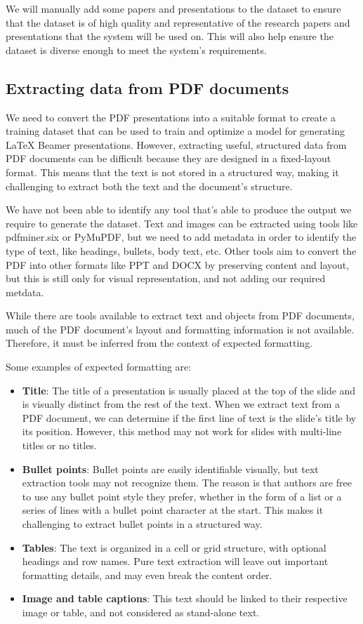 We will manually add some papers and presentations to the dataset to ensure that the dataset is of high quality and representative of the research papers and presentations that the system will be used on. This will also help ensure the dataset is diverse enough to meet the system's requirements.

\subsection{Extracting data from PDF documents}
We need to convert the PDF presentations into a suitable format to create a training dataset that can be used to train and optimize a model for generating LaTeX Beamer presentations. However, extracting useful, structured data from PDF documents can be difficult because they are designed in a fixed-layout format. This means that the text is not stored in a structured way, making it challenging to extract both the text and the document's structure. 

We have not been able to identify any tool that's able to produce the output we require to generate the dataset.  Text and images can be extracted using tools like pdfminer.six or PyMuPDF, but we need to add metadata in order to identify the type of text, like headings, bullets, body text, etc. Other tools aim to convert the PDF into other formats like PPT and DOCX by preserving content and layout, but this is still only for visual representation, and not adding our required metdata.

While there are tools available to extract text and objects from PDF documents, much of the PDF document's layout and formatting information is not available. Therefore, it must be inferred from the context of expected formatting. 

Some examples of expected formatting are:

\begin{itemize}
    \item \textbf{Title}: The title of a presentation is usually placed at the top of the slide and is visually distinct from the rest of the text. When we extract text from a PDF document, we can determine if the first line of text is the slide's title by its position. However, this method may not work for slides with multi-line titles or no titles.
    \item \textbf{Bullet points}: Bullet points are easily identifiable visually, but text extraction tools may not recognize them. The reason is that authors are free to use any bullet point style they prefer, whether in the form of a list or a series of lines with a bullet point character at the start. This makes it challenging to extract bullet points in a structured way. 
    \item \textbf{Tables}: The text is organized in a cell or grid structure, with optional headings and row names. Pure text extraction will leave out important formatting details, and may even break the content order. 
    \item \textbf{Image and table captions}: This text should be linked to their respective image or table, and not considered as stand-alone text.
\end{itemize}

